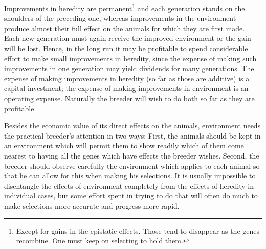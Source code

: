 Improvements in heredity are
permanent\footnote{Except for gains in the
epistatic effects. Those tend to disappear as the genes
recombine. One must keep on selecting to hold them.} and each generation
stands on the shoulders of the preceding one, whereas improvements in
the environment produce almost their full effect on the animals for
which they are first made. Each new generation must again receive the
improved environment or the gain will be lost. Hence, in the long run
it may be profitable to spend considerable effort to make small improvements
in heredity, since the expense of making such improvements in
one generation may yield dividends for many generations. The expense
of making improvements in heredity (so far as those are additive) is a
capital investment; the expense of making improvements in environment
is an operating expense. Naturally the breeder will wish to do
both so far as they are profitable.

Besides the economic value of its direct effects on the animals, environment
needs the practical breeder's attention in two ways; First, the
animals should be kept in an environment which will permit them to
show readily which of them come nearest to having all the genes which
have effects the breeder wishes. Second, the breeder should observe
carefully the environment which applies to each animal so that he can
allow for this when making his selections. It is usually impossible to disentangle
the effects of environment completely from the effects of heredity
in individual cases, but some effort spent in trying to do that will
often do much to make selections more accurate and progress more
rapid.

